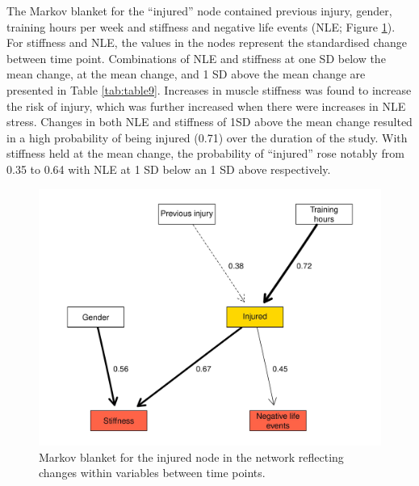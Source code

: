 \documentclass[
  english,
  man]{apa6}
\begin{document}
The Markov blanket for the ``injured'' node contained previous injury, gender, training hours per week and stiffness and negative life events (NLE; Figure \ref{fig:fig5}).
For stiffness and NLE, the values in the nodes represent the standardised change between time point.
Combinations of NLE and stiffness at one SD below the mean change, at the mean change, and 1 SD above the mean change are presented in Table \ref{tab:table9}.
Increases in muscle stiffness was found to increase the risk of injury, which was further increased when there were increases in NLE stress.
Changes in both NLE and stiffness of 1SD above the mean change resulted in a high probability of being injured (0.71) over the duration of the study.
With stiffness held at the mean change, the probability of ``injured'' rose notably from 0.35 to 0.64 with NLE at 1 SD below an 1 SD above respectively.

\begin{figure}

{\centering \includegraphics[width=1\linewidth]{figures_doc/Fig5} 

}

\caption{Markov blanket for the injured node in the network reflecting changes within variables between time points.}\label{fig:fig5}
\end{figure}
\end{document}
